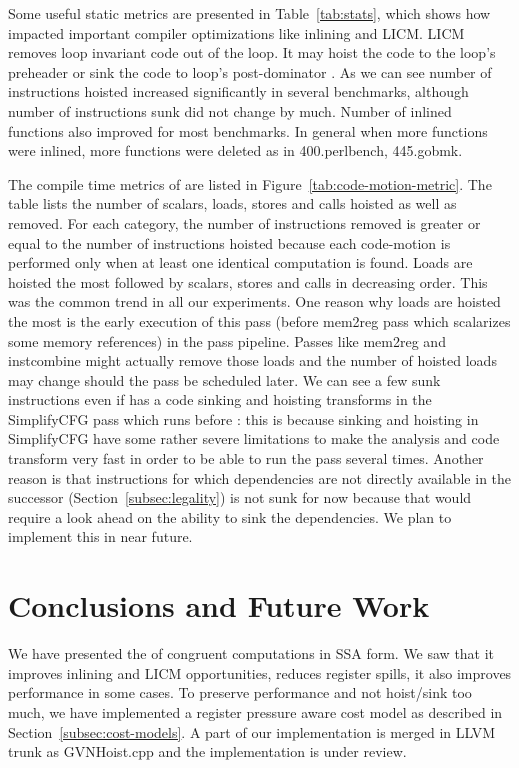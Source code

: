 \documentclass[sigplan,10pt,review,anonymous]{acmart}\settopmatter{printfolios=true,printccs=false,printacmref=false}
\begin{document}
Some useful static metrics are presented in Table~\ref{tab:stats}, which shows
how \gcm{} impacted important compiler optimizations like inlining and
LICM. LICM removes loop invariant code out of the loop. It may hoist the code to
the loop's preheader or sink the code to loop's post-dominator
\cite{steven1997advanced}. As we can see number of instructions hoisted
increased significantly in several benchmarks, although number of instructions
sunk did not change by much.  Number of inlined functions also improved for most
benchmarks. In general when more functions were inlined, more functions were
deleted as in 400.perlbench, 445.gobmk.


The compile time metrics of \GCM{} are listed in
Figure~\ref{tab:code-motion-metric}. The table lists the number of scalars,
loads, stores and calls hoisted as well as removed. For each category, the
number of instructions removed is greater or equal to the number of instructions
hoisted because each code-motion is performed only when at least one identical
computation is found. Loads are hoisted the most followed by scalars, stores and
calls in decreasing order.  This was the common trend in all our
experiments. One reason why loads are hoisted the most is the early execution of
this pass (before mem2reg pass which scalarizes some memory references) in the
\LLVM{} pass pipeline. Passes like mem2reg and instcombine might actually remove
those loads and the number of hoisted loads may change should the \GCM{} pass be
scheduled later. We can see a few sunk instructions even if \LLVM{} has a code
sinking and hoisting transforms in the SimplifyCFG pass which runs before
\GCM{}: this is because sinking and hoisting in SimplifyCFG have some rather
severe limitations to make the analysis and code transform very fast in order to
be able to run the pass several times.  Another reason is that instructions for
which dependencies are not directly available in the successor
(Section~\ref{subsec:legality}) is not sunk for now because that would
require a look ahead on the ability to sink the dependencies. We plan to
implement this in near future.

\section{Conclusions and Future Work}
\label{sec:future-work}

We have presented the \gcm{} of congruent computations in SSA form. We saw that
it improves inlining and LICM opportunities, reduces register spills, it also
improves performance in some cases. To preserve performance and not hoist/sink
too much, we have implemented a register pressure aware cost model as described
in Section~\ref{subsec:cost-models}. A part of our implementation is merged in
LLVM trunk as GVNHoist.cpp and the \GCM{} implementation is under review.
\end{document}
